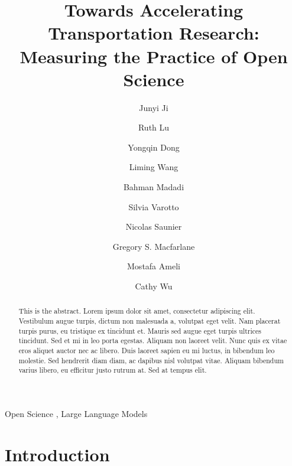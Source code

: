 \documentclass[
  authoryear,
  review,
  3p]{elsarticle}
\begin{document}
\begin{frontmatter}
\title{Towards Accelerating Transportation Research: Measuring the
Practice of Open Science}
\author[]{Junyi Ji%
%
}

\author[]{Ruth Lu%
%
}

\author[]{Yongqin Dong%
%
}

\author[]{Liming Wang%
%
}

\author[]{Bahman Madadi%
%
}

\author[]{Silvia Varotto%
%
}

\author[]{Nicolas Saunier%
%
}

\author[1]{Gregory S. Macfarlane%
%
}

\author[]{Mostafa Ameli%
%
}

\author[2]{Cathy Wu%
%
}












        
\begin{abstract}
This is the abstract. Lorem ipsum dolor sit amet, consectetur adipiscing
elit. Vestibulum augue turpis, dictum non malesuada a, volutpat eget
velit. Nam placerat turpis purus, eu tristique ex tincidunt et. Mauris
sed augue eget turpis ultrices tincidunt. Sed et mi in leo porta
egestas. Aliquam non laoreet velit. Nunc quis ex vitae eros aliquet
auctor nec ac libero. Duis laoreet sapien eu mi luctus, in bibendum leo
molestie. Sed hendrerit diam diam, ac dapibus nisl volutpat vitae.
Aliquam bibendum varius libero, eu efficitur justo rutrum at. Sed at
tempus elit.
\end{abstract}





\begin{keyword}
    Open Science \sep 
    Large Language Models
\end{keyword}
\end{frontmatter}
    

\section{Introduction}\label{intro}
\end{document}
